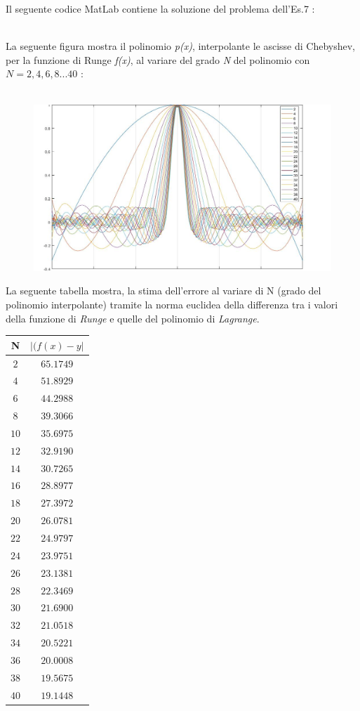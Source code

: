 Il seguente codice MatLab contiene la soluzione del problema dell'Es.7 :\\\
	
La seguente figura mostra il polinomio \textit{p(x)}, interpolante le ascisse di Chebyshev, per la funzione di Runge \textit{f(x)}, al variare del grado \textit{N} del polinomio con $N=2,4,6,8...40$ :\\\
	\begin{figure}[H]
  		\label{Cap_4_Es_7}
  		\includegraphics[width=\textwidth]{Plot/Cap_4_Es_7}
	\end{figure}
La seguente tabella mostra, la stima dell'errore al variare di N (grado del polinomio interpolante) tramite la norma euclidea 
della differenza tra i valori della funzione di \textit{Runge} e quelle del polinomio di \textit{Lagrange}.
	\begin{center}
		\begin{tabular}{|c|c|}
			\hline
				N & $|(f(x)-y|$ \\
    			\hline
    				$2$  & $65.1749$ \\
    				$4$  & $51.8929$ \\
    				$6$  & $44.2988$ \\
    				$8$  & $39.3066$ \\
    				$10$ & $35.6975$ \\
    				$12$ & $32.9190$ \\
    				$14$ & $30.7265$ \\
    				$16$ & $28.8977$ \\
    				$18$ & $27.3972$ \\
    				$20$ & $26.0781$ \\
    				$22$ & $24.9797$ \\
   					$24$ & $23.9751$ \\
    				$26$ & $23.1381$ \\
    				$28$ & $22.3469$ \\
    				$30$ & $21.6900$ \\
    				$32$ & $21.0518$ \\
    				$34$ & $20.5221$ \\
    				$36$ & $20.0008$ \\
    				$38$ & $19.5675$ \\
    				$40$ & $19.1448$ \\
				\hline
		\end{tabular}
	\end{center} 
